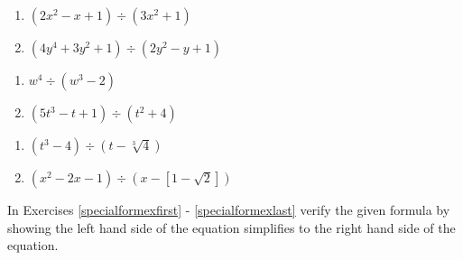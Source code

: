 \documentclass{ximera}
\begin{document}
\begin{multicols}{2}
\begin{enumerate}
\setcounter{enumi}{\value{HW}}

\item $(2x^2 - x + 1) \div (3x^2 + 1)$

\item $(4y^4+3y^2+1) \div (2y^2-y+1)$

\setcounter{HW}{\value{enumi}}
\end{enumerate}
\end{multicols}

\begin{multicols}{2}
\begin{enumerate}
\setcounter{enumi}{\value{HW}}

\item $w^4 \div (w^3 - 2)$
\item $(5t^3 - t + 1) \div (t^2 + 4)$



\setcounter{HW}{\value{enumi}}
\end{enumerate}
\end{multicols}

\begin{multicols}{2}
\begin{enumerate}
\setcounter{enumi}{\value{HW}}
\item $(t^3 - 4) \div (t - \sqrt[3]{4})$

\item $(x^2-2x-1) \div (x-[1-\sqrt{2}])$  \label{polydivexlast}

\setcounter{HW}{\value{enumi}}
\end{enumerate}
\end{multicols}

In Exercises \ref{specialformexfirst} - \ref{specialformexlast} verify the given formula by showing the left hand side of the equation simplifies to the right hand side of the equation.
\end{document}
